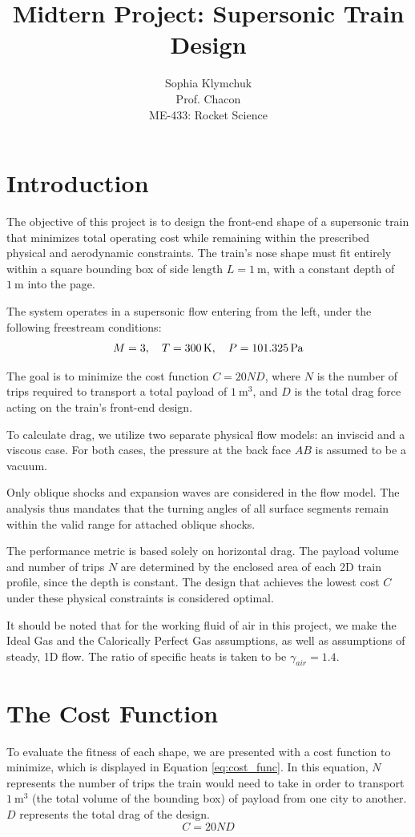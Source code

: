 \documentclass[11pt]{article}
\title{Midtern Project: Supersonic Train Design}
\author{Sophia Klymchuk \\
\small Prof. Chacon \\ 
\small ME-433: Rocket Science}
\begin{document}
\maketitle

\section{Introduction}

The objective of this project is to design the front-end shape of a supersonic train that minimizes total operating cost while remaining within the prescribed physical and aerodynamic constraints. The train’s nose shape must fit entirely within a square bounding box of side length $L = \SI{1}{\meter}$, with a constant depth of $\SI{1}{\meter}$ into the page.

The system operates in a supersonic flow entering from the left, under the following freestream conditions:
\[
M = 3, \quad T = \SI{300}{\kelvin}, \quad P = \SI{101{,}325}{\pascal}
\]

The goal is to minimize the cost function $C = 20ND$, where $N$ is the number of trips required to transport a total payload of $\SI{1}{\meter^3}$, and $D$ is the total drag force acting on the train’s front-end design.

To calculate drag, we utilize two separate physical flow models: an inviscid and a viscous case. For both cases, the pressure at the back face $AB$ is assumed to be a vacuum.

Only oblique shocks and expansion waves are considered in the flow model. The analysis thus mandates that the turning angles of all surface segments remain within the valid range for attached oblique shocks.

The performance metric is based solely on horizontal drag. The payload volume and number of trips $N$ are determined by the enclosed area of each 2D train profile, since the depth is constant. The design that achieves the lowest cost $C$ under these physical constraints is considered optimal.

It should be noted that for the working fluid of air in this project, we make the Ideal Gas and the Calorically Perfect Gas assumptions, as well as assumptions of steady, 1D flow. The ratio of specific heats is taken to be $\gamma_{air}=1.4$.

\section{The Cost Function}
To evaluate the fitness of each shape, we are presented with a cost function to minimize, which is displayed in Equation \ref{eq:cost_func}. In this equation, $N$ represents the number of trips the train would need to take in order to transport $\SI{1}{\meter^3}$ (the total volume of the bounding box) of payload from one city to another. $D$ represents the total drag of the design.
\begin{equation}
C = 20 N D
\label{eq:cost_func}
\end{equation} 
\end{document}
